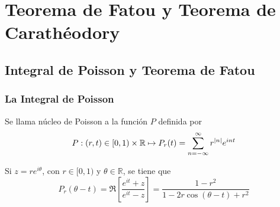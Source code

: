 \chapter{Teorema de Fatou y Teorema de Carathéodory}

\begin{comment}
\begin{theorem}[Lema de Schwart]
Sea $f: \mathbb{D} \rightarrow \overline{\mathbb{D}}$ una función $\in \mathcal{H}(\mathbb{D})$ tal que $f(0) = 0$. Entonces:
\begin{itemize}
    \item $\abs{f(z)} \leq \abs{z}$ para todo $z \in \mathbb{D}$.
    \item Si para algún $z_0 \not = 0$ tenemos que $\abs{f(z_0)} = \abs{z_0}$, entonces existe $\alpha \in \mathbb{C}, \abs{\alpha} = 1$ tal que $f(z)=\alpha z$.
\end{itemize}
\end{theorem}

\begin{proof}
Sea $f(z) = a_1z + \cdots$ la serie de potencias de $f$. El término constante es $0$ puesto que suponemos que $f(0) = 0$. Entonces $f(z)/z$ es una función holomorfa y
\begin{equation*}
\abs{\dfrac{f(z)}{z}} < 1/r \text{ para } \abs{z} = r < 1
\end{equation*}
\end{proof}
\end{comment}

\section{Integral de Poisson y Teorema de Fatou}

\subsection{La Integral de Poisson}

\begin{definition}
Se llama núcleo de Poisson a la función $P$ definida por
\begin{equation*}
P:(r,t) \in [0,1)\times \mathbb{R} \mapsto P_r(t) = \sum_{n=-\infty}^{\infty} r^{\left\lvert n\right\rvert}e^{int}
\end{equation*}

Si $z=re^{i \theta}$, con $r \in [0,1)$ y $\theta \in \mathbb{R}$, se tiene que
\begin{equation*}
P_r(\theta - t) = \Re \left[ \dfrac{e^{it} + z}{e^{it} - z} \right] = \dfrac{1 - r^2}{1 - 2r \cos (\theta - t) + r^2}
\end{equation*}
\end{definition}

